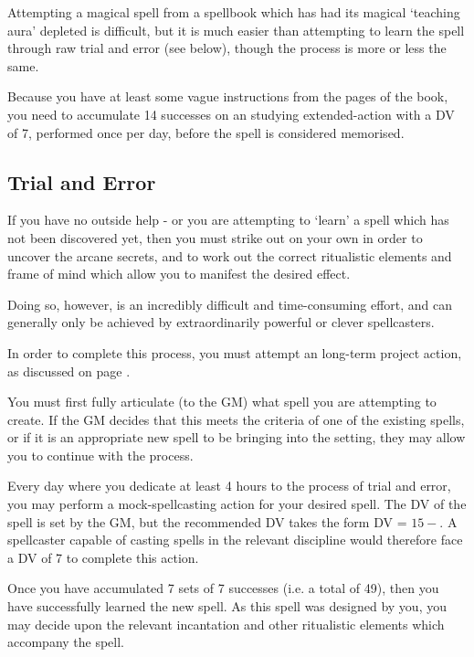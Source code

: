Attempting a magical spell from a spellbook which has had its magical `teaching aura' depleted is difficult, but it is much easier than attempting to learn the spell through raw trial and error (see below), though the process is more or less the same. 

Because you have at least some vague instructions from the pages of the book, you need to accumulate 14 successes on an studying extended-action with a DV of 7, performed once per day, before the spell is considered memorised. 


\subsection{Trial and Error}

If you have no outside help - or you are attempting to `learn' a spell which has not been discovered yet, then you must strike out on your own in order to uncover the arcane secrets, and to work out the correct ritualistic elements and frame of mind which allow you to manifest the desired effect. 

Doing so, however, is an incredibly difficult and time-consuming effort, and can generally only be achieved by extraordinarily powerful or clever spellcasters. 

In order to complete this process, you must attempt an long-term project action, as discussed on page \pageref{S:Extended}. 

You must first fully articulate (to the GM) what spell you are attempting to create. If the GM decides that this meets the criteria of one of the existing spells, or if it is an appropriate new spell to be bringing into the setting, they may allow you to continue with the process. 

Every day where you dedicate at least 4 hours to the process of trial and error, you may perform a mock-spellcasting action for your desired spell. The DV of the spell is set by the GM, but the recommended DV takes the form DV = $15 - $. A spellcaster capable of casting \levelSeven{} spells in the relevant discipline would therefore face a DV of 7 to complete this action. 

Once you have accumulated 7 sets of 7 successes (i.e. a total of 49), then you have successfully learned the new spell. As this spell was designed by you, you may decide upon the relevant incantation and other ritualistic elements which accompany the spell.  



